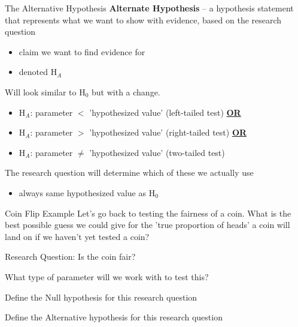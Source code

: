 \documentclass{beamer}
\begin{document}
\begin{frame}{The Alternative Hypothesis}
\textbf{Alternate Hypothesis} -- a hypothesis statement that represents what we want to show with evidence, based on the research question
\begin{itemize}
    \item claim we want to find evidence for
    \item denoted H$_A$
\end{itemize} \vspace{8mm}

Will look similar to H$_0$ but with a change.
\begin{itemize}
    \item H$_A$: parameter $<$ 'hypothesized value' (left-tailed test) \textbf{\underline{OR}}
    \item H$_A$: parameter $>$ 'hypothesized value' (right-tailed test) \textbf{\underline{OR}}
    \item H$_A$: parameter $\neq$ 'hypothesized value' (two-tailed test)
\end{itemize} \vspace{6mm}

The research question will determine which of these we actually use
\begin{itemize}
    \item always same hypothesized value as H$_0$
\end{itemize}

\end{frame}

\begin{frame}{Coin Flip Example}
Let's go back to testing the fairness of a coin. What is the best possible guess we could give for the 'true proportion of heads' a coin will land on if we haven't yet tested a coin? 
\vspace{4mm}

Research Question: Is the coin fair? 

\hrulefill
\vspace{2mm}

What type of parameter will we work with to test this? \vspace{12mm}

Define the Null hypothesis for this research question \vspace{12mm}

Define the Alternative hypothesis for this research question \vspace{12mm}
\end{frame}
\end{document}
